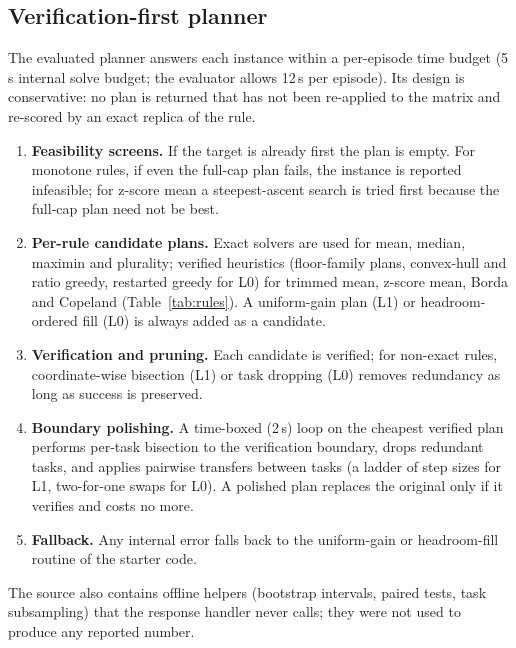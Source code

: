 \documentclass{article}
\begin{document}
\subsection{Verification-first planner}\label{sec:planner}
The evaluated planner answers each instance within a per-episode time budget (5\,s internal solve budget; the evaluator allows 12\,s per episode). Its design is conservative: no plan is returned that has not been re-applied to the matrix and re-scored by an exact replica of the rule.
\begin{enumerate}
\item \textbf{Feasibility screens.} If the target is already first the plan is empty. For monotone rules, if even the full-cap plan fails, the instance is reported infeasible; for z-score mean a steepest-ascent search is tried first because the full-cap plan need not be best.
\item \textbf{Per-rule candidate plans.} Exact solvers are used for mean, median, maximin and plurality; verified heuristics (floor-family plans, convex-hull and ratio greedy, restarted greedy for L0) for trimmed mean, z-score mean, Borda and Copeland (Table~\ref{tab:rules}). A uniform-gain plan (L1) or headroom-ordered fill (L0) is always added as a candidate.
\item \textbf{Verification and pruning.} Each candidate is verified; for non-exact rules, coordinate-wise bisection (L1) or task dropping (L0) removes redundancy as long as success is preserved.
\item \textbf{Boundary polishing.} A time-boxed (2\,s) loop on the cheapest verified plan performs per-task bisection to the verification boundary, drops redundant tasks, and applies pairwise transfers between tasks (a ladder of step sizes for L1, two-for-one swaps for L0). A polished plan replaces the original only if it verifies and costs no more.
\item \textbf{Fallback.} Any internal error falls back to the uniform-gain or headroom-fill routine of the starter code.
\end{enumerate}
The source also contains offline helpers (bootstrap intervals, paired tests, task subsampling) that the response handler never calls; they were not used to produce any reported number.
\end{document}
